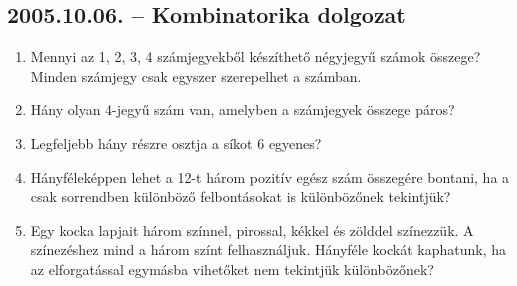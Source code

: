 \documentclass{article}
\begin{document}
\subsection*{2005.10.06. -- Kombinatorika dolgozat}
\begin{enumerate}
\item Mennyi az 1, 2, 3, 4 számjegyekből készíthető
négyjegyű számok összege? Minden számjegy csak egyszer szerepelhet a számban.
\item Hány olyan 4-jegyű szám van, amelyben a számjegyek összege páros?
\item Legfeljebb hány részre osztja a síkot 6 egyenes?
\item Hányféleképpen lehet a 12-t három pozitív egész szám összegére bontani, ha a csak sorrendben különböző felbontásokat is különbözőnek tekintjük?
\item Egy kocka lapjait három színnel, pirossal, kékkel és zölddel színezzük. A színezéshez mind a három színt felhasználjuk.
Hányféle kockát kaphatunk, ha az elforgatással egymásba vihetőket nem tekintjük különbözőnek?
\end{enumerate}
\end{document}
